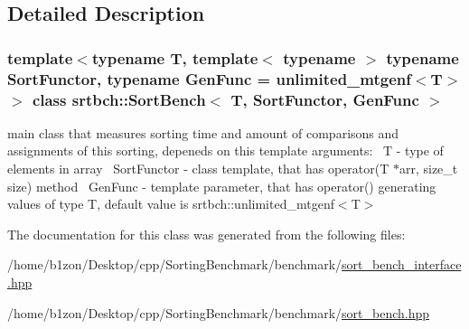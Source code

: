 \subsection{Detailed Description}
\subsubsection*{template$<$typename T, template$<$ typename $>$ typename Sort\+Functor, typename Gen\+Func = unlimited\+\_\+mtgenf$<$\+T$>$$>$\newline
class srtbch\+::\+Sort\+Bench$<$ T, Sort\+Functor, Gen\+Func $>$}

main class that measures sorting time and amount of comparisons and assignments of this sorting, depeneds on this template arguments\+:~\newline
T -\/ type of elements in array~\newline
Sort\+Functor -\/ class template, that has operator(\+T $\ast$arr, size\+\_\+t size) method~\newline
Gen\+Func -\/ template parameter, that has operator() generating values of type T, default value is srtbch\+::unlimited\+\_\+mtgenf$<$\+T$>$ 

The documentation for this class was generated from the following files\+:\begin{DoxyCompactItemize}
\item 
/home/b1zon/\+Desktop/cpp/\+Sorting\+Benchmark/benchmark/\hyperlink{sort__bench__interface_8hpp}{sort\+\_\+bench\+\_\+interface.\+hpp}\item 
/home/b1zon/\+Desktop/cpp/\+Sorting\+Benchmark/benchmark/\hyperlink{sort__bench_8hpp}{sort\+\_\+bench.\+hpp}\end{DoxyCompactItemize}
